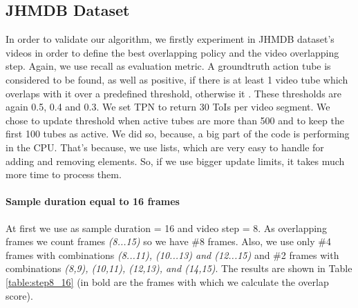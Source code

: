 \subsection{JHMDB Dataset}

In order to validate our algorithm, we firstly experiment in JHMDB dataset's videos in order to define the best overlapping policy and
the video overlapping step. Again, we use recall as evaluation metric. A groundtruth action tube is considered to be found, as well as positive,
if there is at least 1 video tube which overlaps with it over a predefined threshold, otherwise it .  These thresholds are again 0.5, 0.4 and 0.3.
We set TPN to return 30 ToIs per video segment.
We chose to update threshold when active tubes are more than 500 and to keep the first 100 tubes as active. We did so, because, a big part of the
code is performing in the CPU. That's because, we use lists, which are very easy to handle for adding and removing elements. So, if we use bigger update
limits, it takes much more time to process them.

\paragraph{Sample duration equal to 16 frames} At first we use as sample duration = 16 and video step = 8. As overlapping frames we count frames
\textit{(8...15)} so we have \#8 frames. Also, we use only \#4 frames with combinations \textit{(8...11), (10...13) and (12...15)} and 
\#2 frames with combinations \textit{(8,9), (10,11), (12,13), and (14,15)}. The results are shown in Table \ref{table:step8_16} (in bold are
the frames with which we calculate the overlap score).

